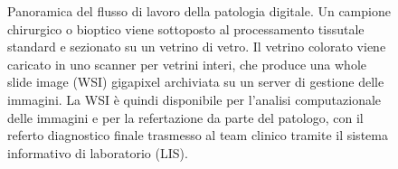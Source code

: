 \begin{figure}[htbp]
  \centering
  
  \caption{Panoramica del flusso di lavoro della patologia digitale. Un campione chirurgico o bioptico viene sottoposto al processamento tissutale standard e sezionato su un vetrino di vetro. Il vetrino colorato viene caricato in uno scanner per vetrini interi, che produce una whole slide image (WSI) gigapixel archiviata su un server di gestione delle immagini. La WSI è quindi disponibile per l'analisi computazionale delle immagini e per la refertazione da parte del patologo, con il referto diagnostico finale trasmesso al team clinico tramite il sistema informativo di laboratorio (LIS).}
  \label{fig:wsi_workflow}
\end{figure}


\begin{figure}[htbp]
  \centering
  
  \label{fig:mindmap_ch1}
\end{figure}
